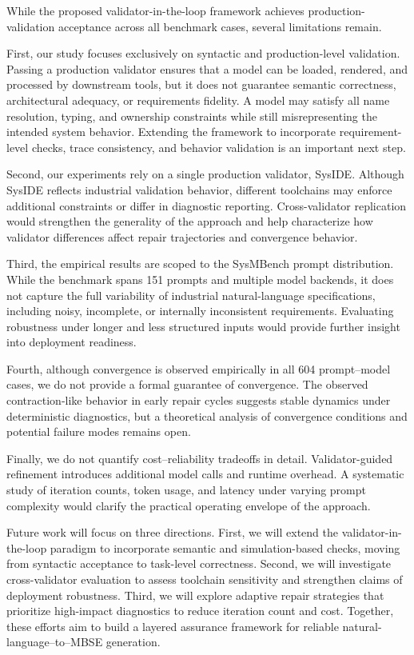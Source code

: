 \documentclass[colorlinks,upint,subscriptcorrection,varvw,hyphenate,balance]{asmeconf} %
\begin{document}
While the proposed validator-in-the-loop framework achieves
production-validation acceptance across all benchmark cases,
several limitations remain.

First, our study focuses exclusively on syntactic and production-level
validation. Passing a production validator ensures that a model can
be loaded, rendered, and processed by downstream tools, but it does
not guarantee semantic correctness, architectural adequacy, or
requirements fidelity. A model may satisfy all name resolution,
typing, and ownership constraints while still misrepresenting the
intended system behavior. Extending the framework to incorporate
requirement-level checks, trace consistency, and behavior validation
is an important next step.

Second, our experiments rely on a single production validator,
SysIDE. Although SysIDE reflects industrial validation behavior,
different toolchains may enforce additional constraints or differ in
diagnostic reporting. Cross-validator replication would strengthen
the generality of the approach and help characterize how validator
differences affect repair trajectories and convergence behavior.

Third, the empirical results are scoped to the SysMBench prompt
distribution. While the benchmark spans 151 prompts and multiple
model backends, it does not capture the full variability of industrial
natural-language specifications, including noisy, incomplete, or
internally inconsistent requirements. Evaluating robustness under
longer and less structured inputs would provide further insight into
deployment readiness.

Fourth, although convergence is observed empirically in all 604
prompt--model cases, we do not provide a formal guarantee of
convergence. The observed contraction-like behavior in early repair
cycles suggests stable dynamics under deterministic diagnostics,
but a theoretical analysis of convergence conditions and potential
failure modes remains open.

Finally, we do not quantify cost--reliability tradeoffs in detail.
Validator-guided refinement introduces additional model calls and
runtime overhead. A systematic study of iteration counts, token
usage, and latency under varying prompt complexity would clarify
the practical operating envelope of the approach.

Future work will focus on three directions. First, we will extend the
validator-in-the-loop paradigm to incorporate semantic and
simulation-based checks, moving from syntactic acceptance to
task-level correctness. Second, we will investigate cross-validator
evaluation to assess toolchain sensitivity and strengthen claims of
deployment robustness. Third, we will explore adaptive repair
strategies that prioritize high-impact diagnostics to reduce iteration
count and cost. Together, these efforts aim to build a layered
assurance framework for reliable natural-language--to--MBSE
generation.




\appendix


\end{document}
